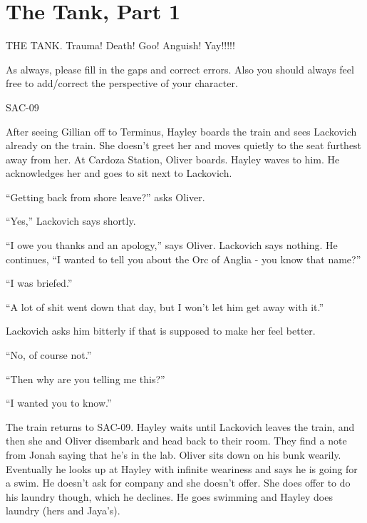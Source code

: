 \setcounter{chapter}{ 9 }
\chapter{\textbf{The Tank, Part 1} }



\subChapterTitle{}




THE TANK.  Trauma!  Death!  Goo!  Anguish!   Yay!!!!!



As always, please fill in the gaps and correct errors.  Also you should always feel free to add/correct the perspective of your character.



\noindent\hrulefill





 {\LARGE SAC-09 } 



After seeing Gillian off to Terminus, Hayley boards the train and sees Lackovich already on the train.  She doesn't greet her and moves quietly to the seat furthest away from her.  At Cardoza Station, Oliver boards.  Hayley waves to him. He acknowledges her and goes to sit next to Lackovich.



``Getting back from shore leave?'' asks Oliver.

``Yes,'' Lackovich says shortly.

``I owe you thanks and an apology,'' says Oliver.  Lackovich says nothing.  He continues, ``I wanted to tell you about the Orc of Anglia - you know that name?''

``I was briefed.''

``A lot of shit went down that day, but I won't let him get away with it.''

Lackovich asks him bitterly if that is supposed to make her feel better.

``No, of course not.''

``Then why are you telling me this?''

``I wanted you to know.''



The train returns to SAC-09.  Hayley waits until Lackovich leaves the train, and then she and Oliver disembark and head back to their room.  They find a note from Jonah saying that he's in the lab.  Oliver sits down on his bunk wearily.  Eventually he looks up at Hayley with infinite weariness and says he is going for a swim.  He doesn't ask for company and she doesn't offer.  She does offer to do his laundry though, which he declines.  He goes swimming and Hayley does laundry (hers and Jaya's).



